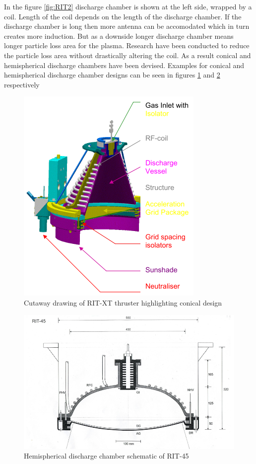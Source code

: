 In the figure \ref{fig:RIT2} discharge chamber is shown at the left side, wrapped by a coil. Length of the coil depends on the length of the discharge chamber. If the discharge chamber is long 
then more antenna can be accomodated which in turn creates more induction. But as a downside longer discharge chamber means longer particle loss area for the plasma. Research have been conducted to reduce the particle loss area without drastically altering the coil. As a result conical and hemispherical discharge chambers have been devised. Examples for conical and hemispherical discharge chamber designs can be seen in figures \ref{fig:RITXT} and \ref{fig:RIT45} respectively

\begin{figure}[ht]
    \centering
    \includegraphics[scale=0.75]{fig/RITXT.png}
    \caption[Cutaway drawing of RIT-XT thruster highlighting conical design]{Cutaway drawing of RIT-XT thruster highlighting conical design\cite{leiter2003development}}
    \label{fig:RITXT}
\end{figure}
\newpage
\begin{figure}[ht]
    \centering
    \includegraphics[scale=.6]{fig/RIT45.png}
    \caption[Hemispherical discharge chamber schematic of RIT-45]{Hemispherical discharge chamber schematic of RIT-45\cite{loeb2011design}}
    \label{fig:RIT45}
\end{figure}

